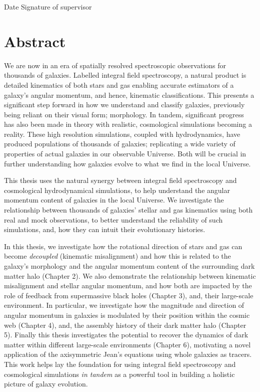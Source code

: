\documentclass[11pt]{book}
\begin{document}
Date  \hspace{1.8in} Signature of supervisor \\


\chapter{Abstract}
We are now in an era of spatially resolved spectroscopic observations for thousands of galaxies. Labelled integral field spectroscopy, a natural product is detailed kinematics of both stars and gas enabling accurate estimators of a galaxy's angular momentum, and hence, kinematic classifications. This presents a significant step forward in how we understand and classify galaxies, previously being reliant on their visual form; morphology. In tandem, significant progress has also been made in theory with realistic, cosmological simulations becoming a reality. These high resolution simulations, coupled with hydrodynamics, have produced populations of thousands of galaxies; replicating a wide variety of properties of actual galaxies in our observable Universe. Both will be crucial in further understanding how galaxies evolve to what we find in the local Universe. 

This thesis uses the natural synergy between integral field spectroscopy and cosmological hydrodynamical simulations, to help understand the angular momentum content of galaxies in the local Universe. We investigate the relationship between thousands of galaxies' stellar and gas kinematics using both real and mock observations, to better understand the reliability of such simulations, and, how they can intuit their evolutionary histories.

In this thesis, we investigate how the rotational direction of stars and gas can become \textit{decoupled} (kinematic misalignment) and how this is related to the galaxy's morphology and the angular momentum content of the surrounding dark matter halo (Chapter 2). We also demonstrate the relationship between kinematic misalignment and stellar angular momentum, and how both are impacted by the role of feedback from supermassive black holes (Chapter 3), and, their large-scale environment. In particular, we investigate how the magnitude and direction of angular momentum in galaxies is modulated by their position within the cosmic web (Chapter 4), and, the assembly history of their dark matter halo (Chapter 5). Finally this thesis investigates the potential to recover the dynamics of dark matter within different large-scale environments (Chapter 6), motivating a novel application of the axisymmetric Jean's equations using whole galaxies as tracers. This work helps lay the foundation for using integral field spectroscopy and cosmological simulations \textit{in tandem} as a powerful tool in building a holistic picture of galaxy evolution.
\end{document}
